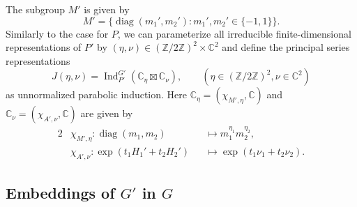 \documentclass[a4paper,11pt,reqno]{amsart}
\newcommand{\CC}{\mathbb{C}}
\newcommand{\ZZ}{\mathbb{Z}}
\newcommand{\0}{{\bf 0}}
\newcommand{\1}{{\bf 1}}
\DeclareMathOperator{\Ind}{Ind}
\DeclareMathOperator{\diag}{diag}
\theoremstyle{plain}
\theoremstyle{definition}
\numberwithin{equation}{section}
\theoremstyle{definition}
\begin{document}
The subgroup $M'$ is given by
\[
M'=\big\{\diag(m_1',m_2') :  m_1',m_2'\in \{-1,1\}\big\}.
\]
Similarly to the case for $P$, we can parameterize all irreducible finite-dimensional representations of $P'$ by $(\eta,\nu)\in (\ZZ/2\ZZ)^2\times \CC^2$ and define the principal series representations 
\[
J(\eta,\nu)=\Ind_{P'}^{G'}(\CC_{\eta}\boxtimes \CC_\nu),\qquad (\eta\in (\ZZ/2\ZZ)^2,\nu\in \CC^2)
\]
as unnormalized parabolic induction. Here $\CC_\eta=(\chi_{M',\eta},\CC)$ and $\CC_\nu=(\chi_{A',\nu},\CC)$ are given by 
\begin{alignat}{2}
&\chi_{M',\eta}\colon \diag(m_1,m_2)&&\mapsto m_1^{\eta_1}m_2^{\eta_2},
\label{eqn:characterMprime} \\[3pt]
&\chi_{A',\nu}\colon 
\exp(t_1H_1'+t_2H_2')&&\mapsto \exp(t_1\nu_1+t_2\nu_2).
\label{eqn:characterAprime}
\end{alignat}


\subsection{Embeddings of \texorpdfstring{$G'$}{G'} in \texorpdfstring{$G$}{G}}
\label{sec:Gprime}
\end{document}

